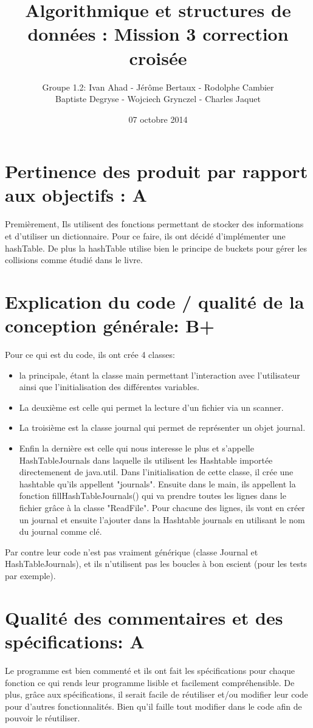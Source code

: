 \documentclass[a4paper]{article}
\title{Algorithmique et structures de données : Mission 3 correction croisée}
\date{07 octobre 2014}
\author{Groupe 1.2: Ivan Ahad - Jérôme Bertaux - Rodolphe Cambier \\ 
	Baptiste Degryse - Wojciech Grynczel - Charles Jaquet}
\begin{document}
\maketitle

\section*{Pertinence des produit par rapport aux objectifs : A}
Premièrement, Ils utilisent des fonctions permettant de stocker des informations et d'utiliser un dictionnaire. Pour ce faire, ils ont décidé d'implémenter une hashTable.
De plus la hashTable utilise bien le principe de buckets pour gérer les collisions comme étudié dans le livre.

\section*{Explication du code / qualité de la conception générale: B+}
Pour ce qui est du code, ils ont crée 4 classes:
\begin{itemize}

\item la principale, étant la classe main permettant l'interaction avec l'utilisateur ainsi que l'initialisation des différentes variables.
\item La deuxième est celle qui permet la lecture d'un fichier via un scanner.
\item La troisième est la classe journal qui permet de représenter un objet journal. 
\item Enfin la dernière est celle qui nous interesse le plus et s'appelle HashTableJournals dans laquelle ils utilisent les Hashtable importée directemenent de java.util.
Dans l'initialisation de cette classe, il crée une hashtable qu'ils appellent "journals". Ensuite dans le main, ils appellent la fonction fillHashTableJournals() qui va prendre toutes les lignes dans le fichier grâce à la classe "ReadFile". Pour chacune des lignes, ils vont en créer un journal et ensuite l'ajouter dans la Hashtable journals en utilisant le nom du journal comme clé.
\end{itemize}

Par contre leur code n'est pas vraiment générique (classe Journal et HashTableJournals), et ils n'utilisent pas les boucles à bon escient (pour les tests par exemple). 

\section*{Qualité des commentaires et des spécifications: A}
Le programme est bien commenté et ils ont fait les spécifications pour chaque fonction ce qui rends leur programme lisible et facilement compréhensible. De plus, grâce aux spécifications, il serait facile de réutiliser et/ou modifier leur code pour d'autres fonctionnalités. Bien qu'il faille tout modifier dans le code afin de pouvoir le réutiliser.
\end{document}
